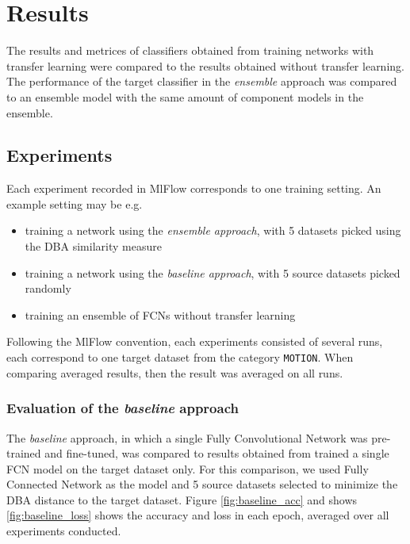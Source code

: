 \documentclass[a4paper,11pt,twoside]{report}
\theoremstyle{definition}
\begin{document}
\chapter{Results}
The results and metrices of classifiers obtained from training networks with transfer learning were compared to the results obtained without transfer learning. The performance of the target classifier in the\textit{ ensemble }approach was compared to an ensemble model with the same amount of component models in the ensemble.

\section{Experiments}
Each experiment recorded in MlFlow corresponds to one training setting. An example setting may be e.g. \begin{itemize}
\item training a network using the \textit{ensemble approach}, with 5 datasets picked using the DBA similarity measure
 \item training a network using the \textit{baseline approach}, with 5 source datasets picked randomly
 \item training an ensemble of FCNs without transfer learning

\end{itemize}
Following the MlFlow convention, each experiments consisted of several runs, each correspond to one target dataset from the category \texttt{MOTION}. When comparing averaged results, then the result was averaged on all runs.

\subsection{Evaluation of the\textit{ baseline} approach}
The \textit{baseline} approach, in which a single Fully Convolutional Network was pre-trained and fine-tuned, was compared to results obtained from trained a single FCN model on the target dataset only. For this comparison, we used Fully Connected Network as the model and 5 source datasets selected to minimize the DBA distance to the target dataset.  Figure \ref{fig:baseline_acc} and  shows \ref{fig:baseline_loss} shows the accuracy and loss in each epoch, averaged over all experiments conducted.


\FloatBarrier
\end{document}
